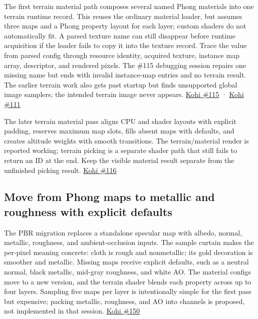 The first terrain material path composes several named Phong materials into one terrain runtime record. This reuses the ordinary material loader, but assumes three maps and a Phong property layout for each layer; custom shaders do not automatically fit. A parsed texture name can still disappear before runtime acquisition if the loader fails to copy it into the texture record. Trace the value from parsed config through resource identity, acquired texture, instance map array, descriptor, and rendered pixels. The \#115 debugging session repairs one missing name but ends with invalid instance-map entries and no terrain result. The earlier terrain work also gets past startup but finds unsupported global image samplers; the intended terrain image never appears. \href{https://www.youtube.com/watch?v=IaFdiRqQ-jw}{Kohi \#115} · \href{https://www.youtube.com/watch?v=J7qBRwaPxv8}{Kohi \#111}

The later terrain material pass aligns CPU and shader layouts with explicit padding, reserves maximum map slots, fills absent maps with defaults, and creates altitude weights with smooth transitions. The terrain/material render is reported working; terrain picking is a separate shader path that still fails to return an ID at the end. Keep the visible material result separate from the unfinished picking result. \href{https://www.youtube.com/watch?v=b_L8RSQlu48}{Kohi \#116}

\subsection{Move from Phong maps to metallic and roughness with explicit defaults}\label{06-engine-ii-ch025-move-from-phong-maps-to-metallic-and-roughness-with-explicit-defaults}

\hypertarget{06-engine-ii-ch025-move-from-phong-maps-to-metallic-and-roughness-with-explicit-defaults}{}

The PBR migration replaces a standalone specular map with albedo, normal, metallic, roughness, and ambient-occlusion inputs. The sample curtain makes the per-pixel meaning concrete: cloth is rough and nonmetallic; its gold decoration is smoother and metallic. Missing maps receive explicit defaults, such as a neutral normal, black metallic, mid-gray roughness, and white AO. The material configs move to a new version, and the terrain shader blends each property across up to four layers. Sampling five maps per layer is intentionally simple for the first pass but expensive; packing metallic, roughness, and AO into channels is proposed, not implemented in that session. \href{https://www.youtube.com/watch?v=SNdjjeRAFc4}{Kohi \#150}


